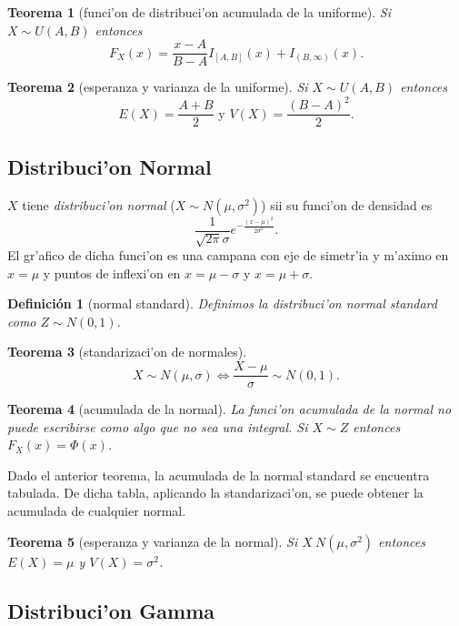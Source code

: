 \documentclass[a4paper,spanish]{article}
\newtheorem{teo}{Teorema}
\newtheorem{defi}{Definici\'on}
\begin{document}
\begin{teo}[funci'on de distribuci'on acumulada de la uniforme]
Si $X \sim U(A,B)$ entonces
$$F_X(x) = \frac{x-A}{B-A} I_{[A,B]}(x) + I_{(B,\infty)}(x).$$
\end{teo}

\begin{teo}[esperanza y varianza de la uniforme]
Si $X \sim U(A,B)$ entonces 
$$E(X) = \frac{A+B}{2} \mbox{\ \ y\ \ } V(X) = \frac{(B-A)^2}{2}.$$
\end{teo}

\subsection{Distribuci'on Normal}

$X$ tiene \emph{distribuci'on normal} ($X \sim N(\mu,\sigma^2)$) sii su 
funci'on de densidad es
$$\frac{1}{\sqrt{2 \pi} \sigma} 
	e ^ {\displaystyle -\frac{(x-\mu)^2}{2 \sigma^2}}.$$
El gr'afico de dicha funci'on es una campana con eje de simetr'ia y m'aximo en
$x = \mu$ y puntos de inflexi'on en $x = \mu-\sigma$ y $x = \mu+\sigma$.

\begin{defi}[normal standard]
Definimos la distribuci'on \emph{normal standard} como $Z \sim N(0,1)$.
\end{defi}

\begin{teo}[standarizaci'on de normales]
$$X \sim N(\mu,\sigma) \Leftrightarrow \frac{X-\mu}{\sigma} \sim N(0,1).$$
\end{teo}

\begin{teo}[acumulada de la normal]
La funci'on acumulada de la normal no puede escribirse como algo que no sea
una integral. Si $X \sim Z$ entonces $F_X(x) = \Phi(x)$.
\end{teo}
Dado el anterior teorema, la acumulada de la normal standard se encuentra
tabulada. De dicha tabla, aplicando la standarizaci'on, se puede obtener
la acumulada de cualquier normal.

\begin{teo}[esperanza y varianza de la normal]
Si $X ~ N(\mu,\sigma^2)$ entonces $E(X) = \mu$ y $V(X) = \sigma^2$.
\end{teo}

\subsection{Distribuci'on Gamma}
\end{document}
